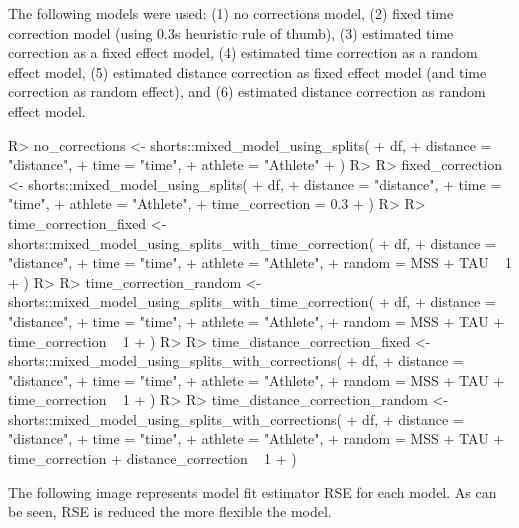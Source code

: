\documentclass[
]{jss}
\begin{document}
The following models were used: (1) no corrections model, (2) fixed time correction model (using 0.3s heuristic rule of thumb), (3) estimated time correction as a fixed effect model, (4) estimated time correction as a random effect model, (5) estimated distance correction as fixed effect model (and time correction as random effect), and (6) estimated distance correction as random effect model.

\begin{CodeChunk}
\begin{CodeInput}
R> no_corrections <- shorts::mixed_model_using_splits(
+   df,
+   distance = "distance",
+   time = "time",
+   athlete = "Athlete"
+ )
R> 
R> fixed_correction <- shorts::mixed_model_using_splits(
+   df,
+   distance = "distance",
+   time = "time",
+   athlete = "Athlete",
+   time_correction = 0.3
+ )
R> 
R> time_correction_fixed <- shorts::mixed_model_using_splits_with_time_correction(
+   df,
+   distance = "distance",
+   time = "time",
+   athlete = "Athlete",
+   random = MSS + TAU ~ 1
+ )
R> 
R> time_correction_random <- shorts::mixed_model_using_splits_with_time_correction(
+   df,
+   distance = "distance",
+   time = "time",
+   athlete = "Athlete",
+   random = MSS + TAU + time_correction ~ 1
+ )
R> 
R> time_distance_correction_fixed <- shorts::mixed_model_using_splits_with_corrections(
+   df,
+   distance = "distance",
+   time = "time",
+   athlete = "Athlete",
+   random = MSS + TAU + time_correction ~ 1
+ )
R> 
R> time_distance_correction_random <- shorts::mixed_model_using_splits_with_corrections(
+   df,
+   distance = "distance",
+   time = "time",
+   athlete = "Athlete",
+   random = MSS + TAU + time_correction + distance_correction ~ 1
+ )
\end{CodeInput}
\end{CodeChunk}

The following image represents model fit estimator RSE for each model. As can be seen, RSE is reduced the more flexible the model.
\end{document}
